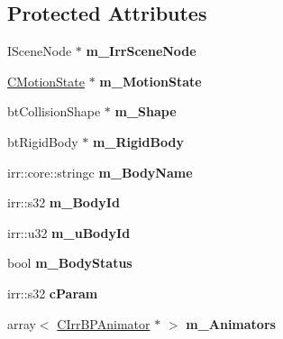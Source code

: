 \subsection*{Protected Attributes}
\begin{DoxyCompactItemize}
\item 
\hypertarget{class_c_irr_b_p_rigid_body_aa49da88d7c108171dadf441915cd2d1c}{
ISceneNode $\ast$ {\bfseries m\_\-IrrSceneNode}}
\label{class_c_irr_b_p_rigid_body_aa49da88d7c108171dadf441915cd2d1c}

\item 
\hypertarget{class_c_irr_b_p_rigid_body_a913c50a2e04215904c69351a000ad5b4}{
\hyperlink{class_c_motion_state}{CMotionState} $\ast$ {\bfseries m\_\-MotionState}}
\label{class_c_irr_b_p_rigid_body_a913c50a2e04215904c69351a000ad5b4}

\item 
\hypertarget{class_c_irr_b_p_rigid_body_a21e96ec352898c0342b2155edb6334b5}{
btCollisionShape $\ast$ {\bfseries m\_\-Shape}}
\label{class_c_irr_b_p_rigid_body_a21e96ec352898c0342b2155edb6334b5}

\item 
\hypertarget{class_c_irr_b_p_rigid_body_a97f19d79af040a5c7a7ace9ae8c5880d}{
btRigidBody $\ast$ {\bfseries m\_\-RigidBody}}
\label{class_c_irr_b_p_rigid_body_a97f19d79af040a5c7a7ace9ae8c5880d}

\item 
\hypertarget{class_c_irr_b_p_rigid_body_a6ce13507bbf89eafdc60ff7a6af36ea2}{
irr::core::stringc {\bfseries m\_\-BodyName}}
\label{class_c_irr_b_p_rigid_body_a6ce13507bbf89eafdc60ff7a6af36ea2}

\item 
\hypertarget{class_c_irr_b_p_rigid_body_a31f24137573d69ec90b25ea6723fb170}{
irr::s32 {\bfseries m\_\-BodyId}}
\label{class_c_irr_b_p_rigid_body_a31f24137573d69ec90b25ea6723fb170}

\item 
\hypertarget{class_c_irr_b_p_rigid_body_a8ff75ddb03bbec7f22c91c8786b3a704}{
irr::u32 {\bfseries m\_\-uBodyId}}
\label{class_c_irr_b_p_rigid_body_a8ff75ddb03bbec7f22c91c8786b3a704}

\item 
\hypertarget{class_c_irr_b_p_rigid_body_a65d97e89e4b6443192011798062699d8}{
bool {\bfseries m\_\-BodyStatus}}
\label{class_c_irr_b_p_rigid_body_a65d97e89e4b6443192011798062699d8}

\item 
\hypertarget{class_c_irr_b_p_rigid_body_aafd90e134007dd14ea335fb44f17585c}{
irr::s32 {\bfseries cParam}}
\label{class_c_irr_b_p_rigid_body_aafd90e134007dd14ea335fb44f17585c}

\item 
\hypertarget{class_c_irr_b_p_rigid_body_a13ee595f0f41a84c96074d4ac9b12a1c}{
array$<$ \hyperlink{class_c_irr_b_p_animator}{CIrrBPAnimator} $\ast$ $>$ {\bfseries m\_\-Animators}}
\label{class_c_irr_b_p_rigid_body_a13ee595f0f41a84c96074d4ac9b12a1c}

\end{DoxyCompactItemize}


